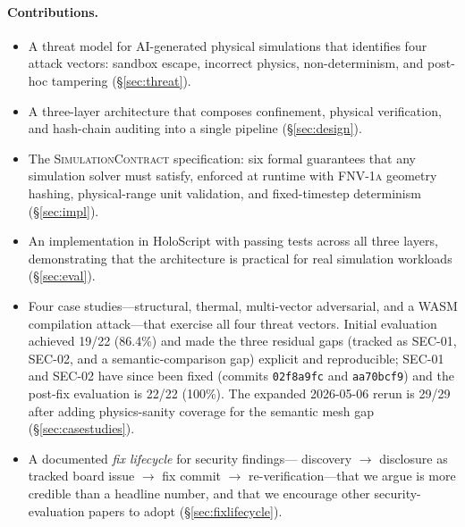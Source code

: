 \documentclass[letterpaper,twocolumn,10pt]{article}
\newcommand{\holoscript}{HoloScript}
\newcommand{\simcontract}{\textsc{SimulationContract}}
\newcommand{\fnvhash}{\textsc{FNV-1a}}
\begin{document}
\paragraph{Contributions.}
\begin{itemize}[leftmargin=*,topsep=2pt,itemsep=1pt]
  \item A threat model for AI-generated physical simulations that
    identifies four attack vectors: sandbox escape, incorrect physics,
    non-determinism, and post-hoc tampering (\S\ref{sec:threat}).
  \item A three-layer architecture that composes confinement, physical
    verification, and hash-chain auditing into a single pipeline
    (\S\ref{sec:design}).
  \item The \simcontract{} specification: six formal guarantees that
    any simulation solver must satisfy, enforced at runtime with
    \fnvhash{} geometry hashing, physical-range unit validation, and
    fixed-timestep determinism (\S\ref{sec:impl}).
  \item An implementation in \holoscript{} with passing tests across
    all three layers, demonstrating that the architecture is practical
    for real simulation workloads (\S\ref{sec:eval}).
  \item Four case studies---structural, thermal, multi-vector adversarial,
    and a WASM compilation attack---that exercise all four threat vectors.
    Initial evaluation achieved 19/22 (86.4\%) and made the three residual
    gaps (tracked as SEC-01, SEC-02, and a semantic-comparison gap)
    explicit and reproducible; SEC-01 and SEC-02 have since been fixed
    (commits \texttt{02f8a9fc} and \texttt{aa70bcf9}) and the post-fix
    evaluation is 22/22 (100\%). The expanded 2026-05-06 rerun is
    29/29 after adding physics-sanity coverage for the semantic mesh gap
    (\S\ref{sec:casestudies}).
  \item A documented \emph{fix lifecycle} for security findings---%
    discovery $\rightarrow$ disclosure as tracked board issue
    $\rightarrow$ fix commit $\rightarrow$ re-verification---that
    we argue is more credible than a headline number, and that we
    encourage other security-evaluation papers to adopt
    (\S\ref{sec:fixlifecycle}).
\end{itemize}
\end{document}

